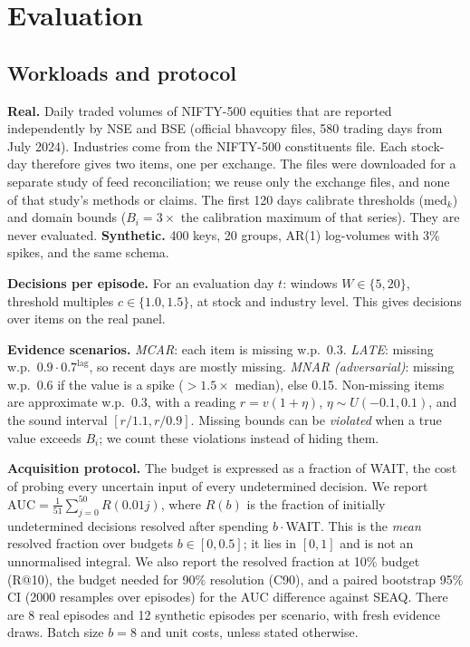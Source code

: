 \documentclass[conference]{IEEEtran}
\newcommand{\seaq}{SEAQ\xspace}
\begin{document}
\section{Evaluation}
\label{sec:eval}
\subsection{Workloads and protocol}
\textbf{Real.} Daily traded volumes of \KReal{} NIFTY-500 equities that are reported independently by NSE and BSE
(official bhavcopy files, 580 trading days from July 2024). Industries come from the NIFTY-500 constituents file.
Each stock-day therefore gives two items, one per exchange. The files were downloaded for a separate study of feed reconciliation;
we reuse only the exchange files, and none of that study's methods or claims. The first 120 days calibrate thresholds
($\mathrm{med}_k$) and domain bounds ($B_i=3\times$ the calibration maximum of that series). They are never evaluated.
\textbf{Synthetic.} 400 keys, 20 groups, AR(1) log-volumes with 3\% spikes, and the same schema.

\textbf{Decisions per episode.} For an evaluation day $t$: windows $W\in\{5,20\}$, threshold multiples
$c\in\{1.0,1.5\}$, at stock and industry level. This gives \ndecReal{} decisions over \nitemsReal{} items on the real panel.

\textbf{Evidence scenarios.} \emph{MCAR}: each item is missing w.p.\ 0.3. \emph{LATE}: missing w.p.\
$0.9\cdot0.7^{\text{lag}}$, so recent days are mostly missing. \emph{MNAR (adversarial)}: missing w.p.\ 0.6 if the value is
a spike ($>1.5\times$ median), else 0.15. Non-missing items are approximate w.p.\ 0.3, with a reading
$r=v(1+\eta)$, $\eta\sim U(-0.1,0.1)$, and the sound interval $[r/1.1,r/0.9]$. Missing bounds can be
\emph{violated} when a true value exceeds $B_i$; we count these violations instead of hiding them.

\textbf{Acquisition protocol.} The budget is expressed as a fraction of WAIT, the cost of probing every uncertain
input of every undetermined decision. We report $\mathrm{AUC}=\frac{1}{51}\sum_{j=0}^{50}R(0.01j)$, where $R(b)$ is the fraction of initially
undetermined decisions resolved after spending $b\cdot$WAIT. This is the \emph{mean} resolved fraction over budgets
$b\in[0,0.5]$; it lies in $[0,1]$ and is not an unnormalised integral. We also report the resolved
fraction at 10\% budget (R@10), the budget needed for 90\% resolution (C90), and a paired bootstrap 95\% CI (2000
resamples over episodes) for the AUC difference against \seaq. There are 8 real episodes and 12 synthetic episodes per scenario, with
fresh evidence draws. Batch size $b=8$ and unit costs, unless stated otherwise.
\end{document}
